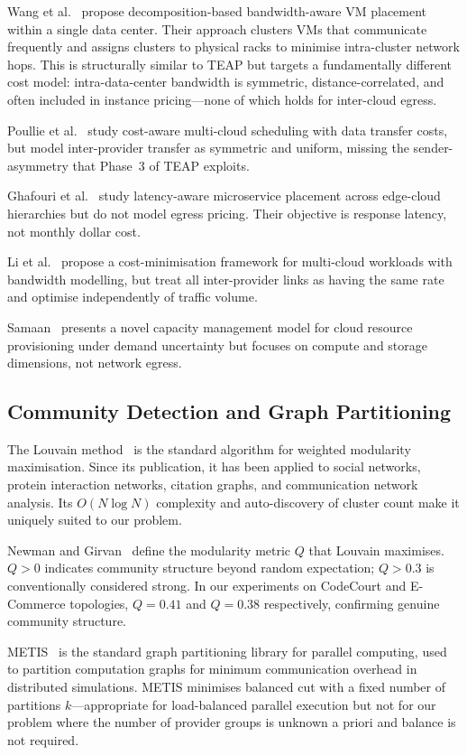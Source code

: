 \documentclass[sigconf,10pt]{acmart}
\begin{document}
Wang et al.~\cite{wang2011} propose decomposition-based bandwidth-aware VM placement
within a single data center.
Their approach clusters VMs that communicate frequently and assigns clusters to
physical racks to minimise intra-cluster network hops.
This is structurally similar to TEAP but targets a fundamentally different cost model:
intra-data-center bandwidth is symmetric, distance-correlated, and often included in
instance pricing---none of which holds for inter-cloud egress.

Poullie et al.~\cite{poullie2017} study cost-aware multi-cloud scheduling with data
transfer costs, but model inter-provider transfer as symmetric and uniform, missing
the sender-asymmetry that Phase~3 of TEAP exploits.

Ghafouri et al.~\cite{ghafouri2019} study latency-aware microservice placement across
edge-cloud hierarchies but do not model egress pricing.
Their objective is response latency, not monthly dollar cost.

Li et al.~\cite{li2020cloud} propose a cost-minimisation framework for multi-cloud
workloads with bandwidth modelling, but treat all inter-provider links as having the
same rate and optimise independently of traffic volume.

Samaan~\cite{samaan2014} presents a novel capacity management model for cloud resource
provisioning under demand uncertainty but focuses on compute and storage dimensions,
not network egress.

\subsection{Community Detection and Graph Partitioning}

The Louvain method~\cite{blondel2008} is the standard algorithm for weighted modularity
maximisation.
Since its publication, it has been applied to social networks, protein interaction
networks, citation graphs, and communication network analysis.
Its $O(N \log N)$ complexity and auto-discovery of cluster count make it uniquely
suited to our problem.

Newman and Girvan~\cite{newman2004} define the modularity metric $Q$ that Louvain
maximises.
$Q > 0$ indicates community structure beyond random expectation; $Q > 0.3$ is
conventionally considered strong.
In our experiments on CodeCourt and E-Commerce topologies, $Q = 0.41$ and $Q = 0.38$
respectively, confirming genuine community structure.

METIS~\cite{karypis1998} is the standard graph partitioning library for parallel
computing, used to partition computation graphs for minimum communication overhead
in distributed simulations.
METIS minimises balanced cut with a fixed number of partitions $k$---appropriate for
load-balanced parallel execution but not for our problem where the number of provider
groups is unknown a priori and balance is not required.
\end{document}
